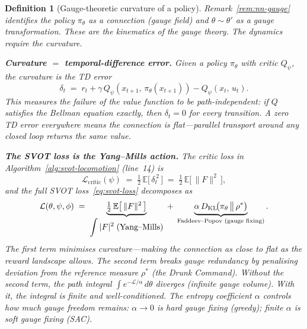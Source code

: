 \documentclass[11pt,a4paper]{article}
\newtheorem{definition}[theorem]{Definition}
\newcommand{\cL}{\mathcal{L}}
\newcommand{\norm}[1]{\lVert #1 \rVert}
\newcommand{\DKL}{D_{\mathrm{KL}}}
\begin{document}
\begin{definition}[Gauge-theoretic curvature of a policy]%
\label{def:gauge-curvature}
\color{black!60}%
Remark~\ref{rem:nn-gauge} identifies the policy
$\pi_\theta$ as a \emph{connection}
(gauge field)
and $\theta \sim \theta'$ as a \emph{gauge
transformation}.
These are the \emph{kinematics} of the gauge theory.
The \emph{dynamics} require the curvature.

\medskip\noindent
\textbf{Curvature $=$ temporal-difference error.}\;
Given a policy $\pi_\theta$ with critic $Q_\psi$,
the \emph{curvature} is the TD error
\begin{equation}\label{eq:td-curvature}
  \delta_t
  \;=\;
  r_t
  + \gamma\,Q_\psi(x_{t+1},\, \pi_\theta(x_{t+1}))
  - Q_\psi(x_t,\, u_t).
\end{equation}
This measures the failure of the value function
to be \emph{path-independent}:
if $Q$ satisfies the Bellman equation exactly,
then $\delta_t = 0$ for every transition.
A zero TD error everywhere means the connection
is \emph{flat}---parallel transport around any
closed loop returns the same value.

\medskip\noindent
\textbf{The SVOT loss is the Yang--Mills action.}\;
The critic loss in
Algorithm~\ref{alg:svot-locomotion} (line~14)
is
\begin{equation}\label{eq:critic-ym}
  \cL_{\mathrm{critic}}(\psi)
  \;=\;
  \tfrac{1}{2}\,
  \mathbb{E}\bigl[\,\delta_t^{\,2}\,\bigr]
  \;=\;
  \tfrac{1}{2}\,
  \mathbb{E}\bigl[\,\norm{F}^2\,\bigr],
\end{equation}
and the full SVOT loss~\eqref{eq:svot-loss}
decomposes as
\begin{equation}\label{eq:svot-ym}
  \cL(\theta, \psi, \phi)
  \;=\;
  \underbrace{%
    \tfrac{1}{2}\,
    \mathbb{E}\bigl[\,\norm{F}^2\,\bigr]
  }_{\displaystyle\int |F|^2\;\text{(Yang--Mills)}}
  \;+\;
  \underbrace{%
    \alpha\,\DKL\!\bigl(\pi_\theta
      \,\big\|\, \rho^*\bigr)
  }_{\text{Faddeev--Popov (gauge fixing)}}.
\end{equation}
The first term minimises curvature---making
the connection as close to flat as the reward
landscape allows.
The second term breaks gauge redundancy by
penalising deviation from the reference
measure $\rho^*$ (the Drunk Command).
Without the second term, the path integral
$\int e^{-\cL/\alpha}\,d\theta$ diverges
(infinite gauge volume).
With it, the integral is finite and well-conditioned.
The entropy coefficient $\alpha$ controls how much
gauge freedom remains:
$\alpha \to 0$ is hard gauge fixing (greedy);
finite $\alpha$ is soft gauge fixing (SAC).
\end{definition}
\end{document}

